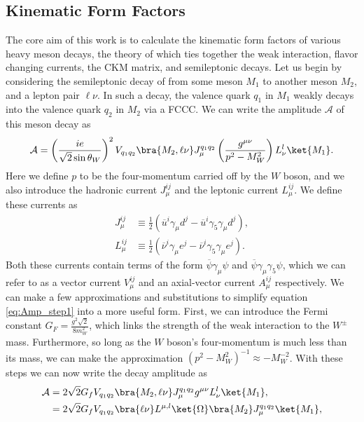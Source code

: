 \subsection{Kinematic Form Factors}
The core aim of this work is to calculate the kinematic form factors of various heavy meson decays, the theory of which ties together the weak interaction, flavor changing currents, the CKM matrix, and semileptonic decays.  Let us begin by considering the semileptonic decay of from some meson $M_1$ to another meson $M_2$, and a lepton pair $\ell\nu$.  In such a decay, the valence quark $q_1$ in $M_1$ weakly decays into the valence quark $q_2$ in $M_2$ via a FCCC.  We can write the amplitude $\mathcal{A}$ of this meson decay as
\begin{equation}\label{eq:Amp_step1}
    \mathcal{A} = \left(\frac{ie}{\sqrt{2}\sin\theta_W}\right)^2 V_{q_1q_2}
        \bra{M_2,\ell\nu}J_\mu^{q_1q_2}\left( \frac{g^{\mu\nu}}{p^2-M^2_W} \right)L_\nu^l\ket{M_1}.
\end{equation}
Here we define $p$ to be the four-momentum carried off by the $W$ boson, and we also introduce the hadronic current $J_\mu^{ij}$ and the leptonic current $L_\mu^{ij}$.  We define these currents as
\begin{equation}\label{eq:currents}
\begin{split}
    J_\mu^{ij} &\equiv \frac{1}{2}(\overline{u}^i\gamma_\mu d^j - \overline{u}^i\gamma_5\gamma_\mu d^j), \\
    L^{ij}_\mu &\equiv \frac{1}{2}(\overline{\nu}^i\gamma_\mu e^j - \overline{\nu}^i\gamma_5\gamma_\mu e^j).
\end{split}
\end{equation}
Both these currents contain terms of the form $\overline{\psi}\gamma_\mu\psi$ and $\overline{\psi}\gamma_\mu\gamma_5\psi$, which we can refer to as a vector current $V_\mu^{ij}$ and an axial-vector current $A_\mu^{ij}$ respectively.  We can make a few approximations and substitutions to simplify equation \ref{eq:Amp_step1} into a more useful form.  First, we can introduce the Fermi constant $G_F = \frac{g^2\sqrt{2}}{8m_W^2}$, which links the strength of the weak interaction to the $W^\pm$ mass.  Furthermore, so long as the $W$ boson's four-momentum is much less than its mass, we can make the approximation $({p^2-M_W^2})^{-1}\approx -{M_W^{-2}}$.  With these steps we can now write the decay amplitude as
\begin{equation}\label{eq:Amp_step2}
\begin{split}
    \mathcal{A} &= 2\sqrt{2} G_f V_{q_1q_2} \bra{M_2,\ell\nu}J_\mu^{q_1q_2}g^{\mu\nu}L_\nu^l\ket{M_1},\\
      &= 2\sqrt{2} G_f V_{q_1q_2}\bra{\ell\nu}L^{\mu,l}\ket{\Omega}\bra{M_2}J_\mu^{q_1q_2}\ket{M_1},
\end{split}
\end{equation}
